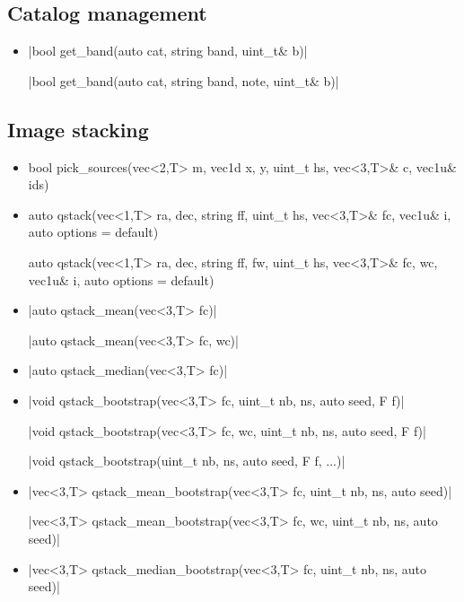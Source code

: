 \documentclass[12pt]{report}
\begin{document}
\subsection{Catalog management}

\begin{itemize}
\item \cppinline|bool get_band(auto cat, string band, uint_t& b)| 

\cppinline|bool get_band(auto cat, string band, note, uint_t& b)| 
\end{itemize}

\subsection{Image stacking}

\begin{itemize}
\item {} \begin{cppcode}
bool pick_sources(vec<2,T> m, vec1d x, y, uint_t hs,
                  vec<3,T>& c, vec1u& ids)
\end{cppcode}

\item {} \begin{cppcode}
auto qstack(vec<1,T> ra, dec, string ff, uint_t hs, vec<3,T>& fc,
            vec1u& i, auto options = default)
\end{cppcode}

\begin{cppcode}
auto qstack(vec<1,T> ra, dec, string ff, fw, uint_t hs,
            vec<3,T>& fc, wc, vec1u& i, auto options = default)
\end{cppcode}

\item \cppinline|auto qstack_mean(vec<3,T> fc)| 

\cppinline|auto qstack_mean(vec<3,T> fc, wc)|

\item \cppinline|auto qstack_median(vec<3,T> fc)| 

\item \cppinline|void qstack_bootstrap(vec<3,T> fc, uint_t nb, ns, auto seed, F f)| 

\cppinline|void qstack_bootstrap(vec<3,T> fc, wc, uint_t nb, ns, auto seed, F f)|

\cppinline|void qstack_bootstrap(uint_t nb, ns, auto seed, F f, ...)|

\item \cppinline|vec<3,T> qstack_mean_bootstrap(vec<3,T> fc, uint_t nb, ns, auto seed)| 

\cppinline|vec<3,T> qstack_mean_bootstrap(vec<3,T> fc, wc, uint_t nb, ns, auto seed)|

\item \cppinline|vec<3,T> qstack_median_bootstrap(vec<3,T> fc, uint_t nb, ns, auto seed)| 
\end{itemize}
\end{document}
